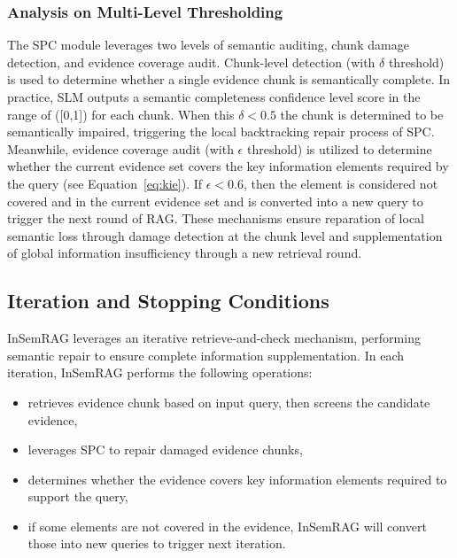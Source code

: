 \subsubsection{Analysis on Multi-Level Thresholding}\label{sec:threshold}
The SPC module leverages two levels of semantic auditing, chunk damage detection, and evidence coverage audit.
Chunk-level detection (with $\delta$ threshold) is used to determine whether a single evidence chunk is semantically complete.
In practice, SLM outputs a semantic completeness confidence level score in the range of ([0,1]) for each chunk.
When this $\delta < 0.5$ the chunk is determined to be semantically impaired, triggering the local backtracking repair process of SPC.
Meanwhile, evidence coverage audit (with $\epsilon$ threshold) is utilized to determine whether the current evidence set covers the key information elements required by the query (see Equation~\ref{eq:kie}). 
If $\epsilon < 0.6$, then the element is considered not covered and in the current evidence set and is converted into a new query to trigger the next round of RAG.
These mechanisms ensure reparation of local semantic loss through damage detection at the chunk level and supplementation of global information insufficiency through a new retrieval round.









\subsection{Iteration and Stopping Conditions}\label{sec:iter}
InSemRAG leverages an iterative retrieve-and-check mechanism, performing semantic repair to ensure complete information supplementation.
In each iteration, InSemRAG performs the following operations:
\begin{itemize}
    \item retrieves evidence chunk based on input query, then screens the candidate evidence,
    \item leverages SPC to repair damaged evidence chunks,
    \item determines whether the evidence covers key information elements required to support the query,
    \item if some elements are not covered in the evidence, InSemRAG will convert those into new queries to trigger next iteration.
\end{itemize}


